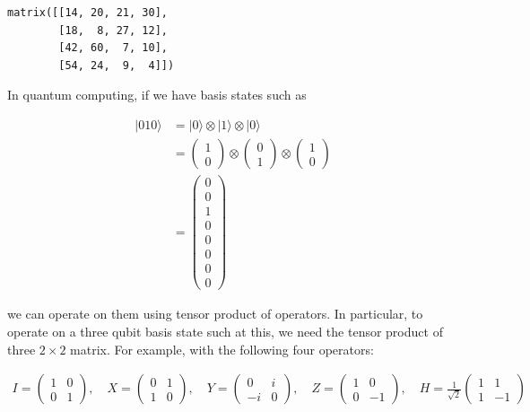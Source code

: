 \documentclass[11pt]{article}
\newcommand{\prompt}[4]{
        \llap{{\color{#2}[#3]: #4}}\vspace{-1.25em}
    }
\begin{document}
            \begin{tcolorbox}[breakable, boxrule=.5pt, size=fbox, pad at break*=1mm, opacityfill=0]
\prompt{Out}{outcolor}{51}{\hspace{3.5pt}}
\begin{Verbatim}[commandchars=\\\{\}]
matrix([[14, 20, 21, 30],
        [18,  8, 27, 12],
        [42, 60,  7, 10],
        [54, 24,  9,  4]])
\end{Verbatim}
\end{tcolorbox}
        
    In quantum computing, if we have basis states such as

\begin{align}
|010\rangle &= |0\rangle \otimes |1\rangle \otimes |0\rangle \\
&= \begin{pmatrix}
1\\0
\end{pmatrix} \otimes 
\begin{pmatrix}
0\\1
\end{pmatrix} \otimes 
\begin{pmatrix}
1\\0
\end{pmatrix} \\
&= \begin{pmatrix}
0\\0\\1\\0\\0\\0\\0\\0
\end{pmatrix}
\end{align}

we can operate on them using tensor product of operators. In particular,
to operate on a three qubit basis state such at this, we need the tensor
product of three \(2 \times 2\) matrix. For example, with the following
four operators:

\begin{align}
I = \begin{pmatrix} 1&0 \\ 0&1 \end{pmatrix}, \quad
X = \begin{pmatrix} 0&1 \\ 1&0 \end{pmatrix}, \quad
Y = \begin{pmatrix} 0&i \\ -i&0 \end{pmatrix}, \quad
Z = \begin{pmatrix} 1&0 \\ 0&-1 \end{pmatrix}, \quad
H = \frac{1}{\sqrt{2}} \begin{pmatrix} 1&1 \\ 1&-1 \end{pmatrix}
\end{align}
\end{document}
